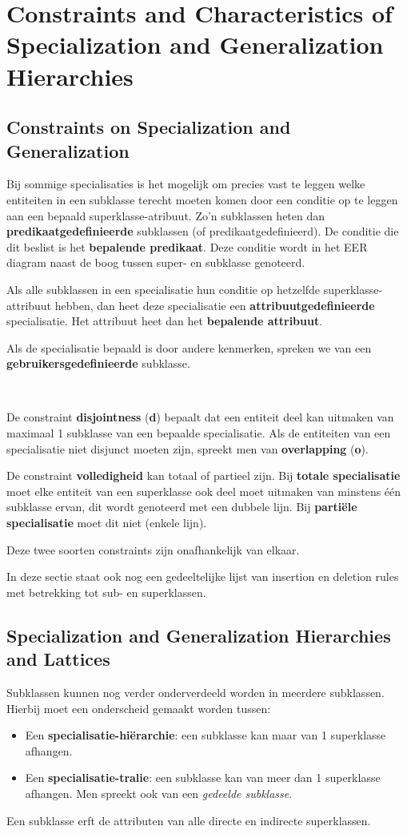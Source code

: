 \section{Constraints and Characteristics of Specialization and Generalization Hierarchies}
\subsection{Constraints on Specialization and Generalization}
Bij sommige specialisaties is het mogelijk om precies vast te leggen welke entiteiten in een subklasse terecht moeten komen door een conditie op te leggen aan een bepaald superklasse-atribuut. Zo'n subklassen heten dan \textbf{predikaatgedefinieerde} subklassen (of predikaatgedefinieerd). De conditie die dit beslist is het \textbf{bepalende predikaat}. Deze conditie wordt in het EER diagram naast de boog tussen super- en subklasse genoteerd.

Als alle subklassen in een specialisatie hun conditie op hetzelfde superklasse-attribuut hebben, dan heet deze specialisatie een \textbf{attribuutgedefinieerde} specialisatie. Het attribuut heet dan het \textbf{bepalende attribuut}.

Als de specialisatie bepaald is door andere kenmerken, spreken we van een \textbf{gebruikersgedefinieerde} subklasse.

~

\noindent De constraint \textbf{disjointness} (\textbf{d}) bepaalt dat een entiteit deel kan uitmaken van maximaal 1 subklasse van een bepaalde specialisatie. Als de entiteiten van een specialisatie niet disjunct moeten zijn, spreekt men van \textbf{overlapping} (\textbf{o}).

De constraint \textbf{volledigheid} kan totaal of partieel zijn. Bij \textbf{totale specialisatie} moet elke entiteit van een superklasse ook deel moet uitmaken van minstens \'e\'en subklasse ervan, dit wordt genoteerd met een dubbele lijn. Bij \textbf{parti\"ele specialisatie} moet dit niet (enkele lijn).

Deze twee soorten constraints zijn onafhankelijk van elkaar.


In deze sectie staat ook nog een gedeeltelijke lijst van insertion en deletion rules met betrekking tot sub- en superklassen.
\subsection{Specialization and Generalization Hierarchies and Lattices}
Subklassen kunnen nog verder onderverdeeld worden in meerdere subklassen. Hierbij moet een onderscheid gemaakt worden tussen:
\begin{itemize}
\item Een \textbf{specialisatie-hi\"erarchie}: een subklasse kan maar van 1 superklasse afhangen.
\item Een \textbf{specialisatie-tralie}: een subklasse kan van meer dan 1 superklasse afhangen. Men spreekt ook van een \textit{gedeelde subklasse}.
\end{itemize}
Een subklasse erft de attributen van alle directe en indirecte superklassen.

